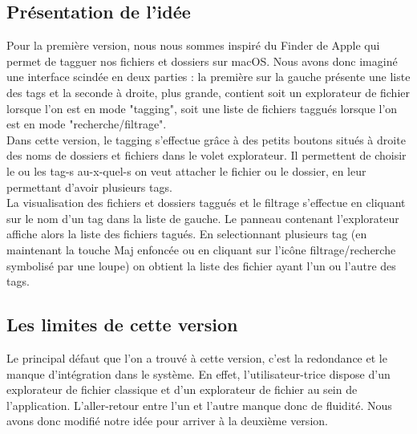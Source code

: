 \documentclass{report}
\begin{document}
        \subsection{Présentation de l'idée}
            Pour la première version, nous nous sommes inspiré du Finder de Apple qui permet de tagguer nos fichiers et dossiers sur macOS. Nous avons donc imaginé une interface scindée en deux parties : la première sur la gauche présente une liste des tags et la seconde à droite, plus grande, contient soit un explorateur de fichier lorsque l'on est en mode "tagging", soit une liste de fichiers taggués lorsque l'on est en mode "recherche/filtrage".\\
        
            

            Dans cette version, le tagging s'effectue grâce à des petits boutons situés à droite des noms de dossiers et fichiers dans le volet explorateur. Il permettent de choisir le ou les tag-s au-x-quel-s on veut attacher le fichier ou le dossier, en leur permettant d'avoir plusieurs tags.\\

            La visualisation des fichiers et dossiers taggués et le filtrage s'effectue en cliquant sur le nom d'un tag dans la liste de gauche. Le panneau contenant l'explorateur affiche alors la liste des fichiers tagués. En selectionnant plusieurs tag (en maintenant la touche Maj enfoncée ou en cliquant sur l'icône filtrage/recherche symbolisé par une loupe) on obtient la liste des fichier ayant l'un ou l'autre des tags.

        \subsection{Les limites de cette version}

            Le principal défaut que l'on a trouvé à cette version, c'est la redondance et le manque d'intégration dans le système. En effet, l'utilisateur-trice dispose d'un explorateur de fichier classique et d'un explorateur de fichier au sein de l'application. L'aller-retour entre l'un et l'autre manque donc de fluidité. Nous avons donc modifié notre idée pour arriver à la deuxième version.
\end{document}
